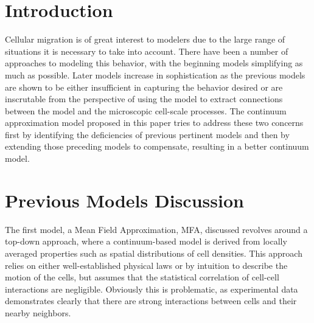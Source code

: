 \documentclass[12pt,letterpaper,cm]{article}
\renewcommand{\.}{\cdot}
\newcommand{\<}{\langle}
\renewcommand{\>}{\rangle}
\begin{document}
	\section{Introduction}
	\indent 
	
	Cellular migration is of great interest to modelers due to the large range of situations it is necessary to take into account.  There have been a number of approaches to modeling this behavior, with the beginning models simplifying as much as possible.  Later models increase in sophistication as the previous models are shown to be either insufficient in capturing the behavior desired or are inscrutable from the perspective of using the model to extract connections between the model and the microscopic cell-scale processes.  The continuum approximation model proposed in this paper tries to address these two concerns first by identifying the deficiencies of previous pertinent models and then by extending those preceding models to compensate, resulting in a better continuum model.   
	
	
	\section{Previous Models Discussion}
	\indent
	
	The first model, a Mean Field Approximation, MFA, discussed revolves around a top-down approach, where a continuum-based model is derived from locally averaged properties such as spatial distributions of cell densities.  This approach relies on either well-established physical laws or by intuition to describe the motion of the cells, but assumes that the statistical correlation of cell-cell interactions are negligible.  Obviously this is problematic, as experimental data demonstrates clearly that there are strong interactions between cells and their nearby neighbors.  
	
\end{document}
